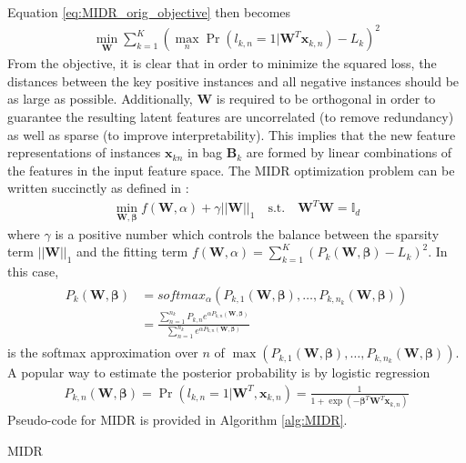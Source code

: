 Equation \ref{eq:MIDR_orig_objective} then becomes 
\begin{align}
	\min_{\bm{W}} \sum_{k=1}^{K} (\max_{n} \Pr(l_{k,n}=1|\bm{W}^{T}\bm{x}_{k,n}) - L_{k})^{2}
	\label{eq:MIDR_instance_objective}
\end{align}
\noindent
From the objective, it is clear that in order to minimize the squared loss, the distances between the key positive instances and all negative instances should be as large as possible. Additionally, $\bm{W}$ is required to be orthogonal in order to guarantee the resulting latent features are uncorrelated (to remove redundancy) as well as sparse (to improve interpretability).  This implies that the new feature representations of instances $\bm{x}_{kn}$ in bag $\bm{B}_{k}$ are formed by linear combinations of the features in the input feature space.  The MIDR optimization problem can be written succinctly as defined in \citep{Zhu2018MIDRSparsity}:
\begin{align}
	\min_{\bm{W},\bm{\beta}} f(\bm{W},\alpha) + \gamma ||\bm{W} ||_{1}  \quad \text{s.t.} \quad \bm{W}^{T}\bm{W} = \mathbb{I}_{d}
	\label{eq:MIDR_objective}
\end{align}
\noindent
where $\gamma$ is a positive number which controls the balance between the sparsity term $||\bm{W}||_{1}$ and the fitting term $f(\bm{W},\alpha)=\sum_{k=1}^{K} (P_{k}(\bm{W},\bm{\beta}) - L_{k})^{2}$.  In this case, 
\begin{align}
	\begin{split}
	P_{k}(\bm{W},\bm{\beta}) &= softmax_{\alpha}(P_{k,1}(\bm{\bm{W}},\bm{\beta}), \dots, P_{k,n_{k}}(\bm{\bm{W}},\bm{\beta})) \\
	&= \frac{\sum_{n=1}^{n_{k}}P_{k,n}e^{\alpha P_{k,n}(\bm{W},\bm{\beta})}}{\sum_{n=1}^{n_{k}}e^{\alpha P_{k,n}(\bm{W},\bm{\beta})}}
	\end{split}
\end{align}
\noindent
is the softmax approximation over $n$ of $\max (P_{k,1}(\bm{\bm{W}},\bm{\beta}), \dots, P_{k,n_{k}}(\bm{\bm{W}},\bm{\beta}))$.  A popular way to estimate the posterior probability is by logistic regression
\begin{align}
	P_{k,n}(\bm{W},\bm{\beta}) = \Pr(l_{k,n}=1|\bm{W}^{T},\bm{x}_{k,n}) = \frac{1}{1+\exp(-\bm{\beta}^{T} \bm{W}^{T}\bm{x}_{k,n})}
\end{align}
\noindent
Pseudo-code for MIDR is provided in Algorithm \ref{alg:MIDR}.

\begin{algorithm}
	\caption{MIDR}
	\label{alg:MIDR}
	\begin{algorithmic}[1]
		\EndFor
		\EndWhile            
	\end{algorithmic}
\end{algorithm}

